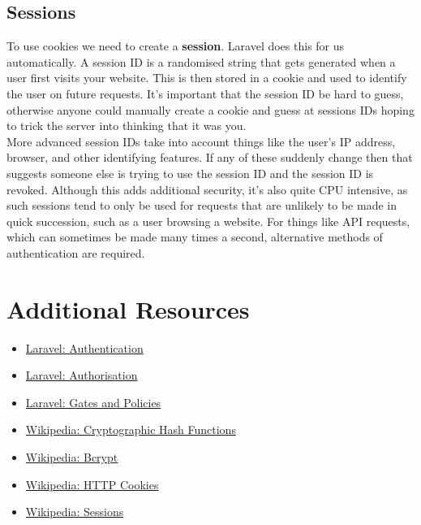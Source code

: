 \subsection{Sessions}

To use cookies we need to create a \textbf{session}. Laravel does this for us automatically. A session ID is a randomised string that gets generated when a user first visits your website. This is then stored in a cookie and used to identify the user on future requests. It's important that the session ID be hard to guess, otherwise anyone could manually create a cookie and guess at sessions IDs hoping to trick the server into thinking that it was you.
\\

More advanced session IDs take into account things like the user's IP address, browser, and other identifying features. If any of these suddenly change then that suggests someone else is trying to use the session ID and the session ID is revoked. Although this adds additional security, it's also quite CPU intensive, as such sessions tend to only be used for requests that are unlikely to be made in quick succession, such as a user browsing a website. For things like API requests, which can sometimes be made many times a second, alternative methods of authentication are required.


\section{Additional Resources}

\begin{itemize}[leftmargin=*]
    \item \href{http://laravel.com/docs/master/authentication}{Laravel: Authentication}
    \item \href{http://laravel.com/docs/master/authorization}{Laravel: Authorisation}
    \item \href{http://laravel.com/docs/master/authorization}{Laravel: Gates and Policies}
    \item \href{https://en.wikipedia.org/wiki/Cryptographic_hash_function}{Wikipedia: Cryptographic Hash Functions}
    \item \href{https://en.wikipedia.org/wiki/Bcrypt}{Wikipedia: Bcrypt}
    \item \href{https://en.wikipedia.org/wiki/HTTP_cookie}{Wikipedia: HTTP Cookies}
    \item \href{https://en.wikipedia.org/wiki/Session_(computer_science)#Server-side_web_sessions}{Wikipedia: Sessions}
\end{itemize}
